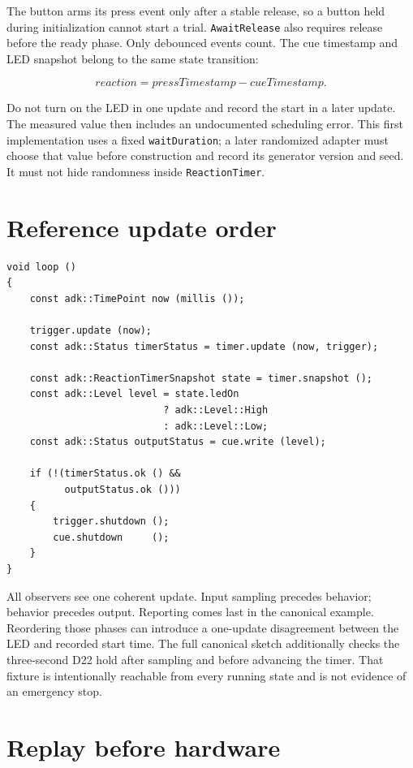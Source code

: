 \documentclass[11pt]{article}
\begin{document}
The button arms its press event only after a stable release, so a button held
during initialization cannot start a trial. \texttt{AwaitRelease} also requires
release before the ready phase. Only debounced events count. The cue timestamp
and LED snapshot belong to the same state transition:

\[
    reaction = pressTimestamp - cueTimestamp.
\]

Do not turn on the LED in one update and record the start in a later update.
The measured value then includes an undocumented scheduling error. This first
implementation uses a fixed \texttt{waitDuration}; a later randomized adapter
must choose that value before construction and record its generator version and
seed. It must not hide randomness inside \texttt{ReactionTimer}.

\section{Reference update order}

\begin{lstlisting}[style=adkcpp]
void loop ()
{
    const adk::TimePoint now (millis ());

    trigger.update (now);
    const adk::Status timerStatus = timer.update (now, trigger);

    const adk::ReactionTimerSnapshot state = timer.snapshot ();
    const adk::Level level = state.ledOn
                           ? adk::Level::High
                           : adk::Level::Low;
    const adk::Status outputStatus = cue.write (level);

    if (!(timerStatus.ok () &&
          outputStatus.ok ()))
    {
        trigger.shutdown ();
        cue.shutdown     ();
    }
}
\end{lstlisting}

All observers see one coherent update. Input sampling precedes behavior; behavior
precedes output. Reporting comes last in the canonical example. Reordering those
phases can introduce a one-update disagreement between the LED and recorded
start time. The full canonical sketch additionally checks the three-second D22
hold after sampling and before advancing the timer. That fixture is intentionally
reachable from every running state and is not evidence of an emergency stop.

\section{Replay before hardware}
\end{document}
